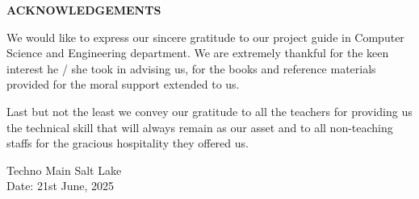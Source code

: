 
\thispagestyle{plain}

\vspace*{\fill} %

\begin{center}
    \LARGE {\bf \uppercase{Acknowledgements}}
   \end{center}
   
   \vspace{0.5\baselineskip}
   
   \noindent
   We would like to express our sincere gratitude to our project guide in Computer Science and Engineering department. We are extremely thankful for the keen interest he / she took in advising us, for the books and reference materials provided for the moral support extended to us.
   
   
   \vspace{\baselineskip}
   \noindent
   Last but not the least we convey our gratitude to all the teachers for providing us the technical skill that will always remain as our asset and to all non-teaching staffs for the gracious hospitality they offered us.

\vspace{-0.5cm}


\hspace{1.0\baselineskip}

\begin{flushright}

\vspace{2.5\baselineskip}
\textls[90]{\textbf{\mynameone ~(\myrollnoone)}}

\vspace{3\baselineskip}
\textls[90]{\textbf{\mynametwo ~(\myrollnotwo)}}

\vspace{3\baselineskip}
\textls[90]{\textbf{\mynamethree ~(\myrollnothree)}}

\vspace{3\baselineskip}
\textls[90]{\textbf{\mynamefour ~(\myrollnofour)}}

\end{flushright}



\noindent
Techno Main Salt Lake \\
Date: 21st June, 2025

\vspace*{\fill} %